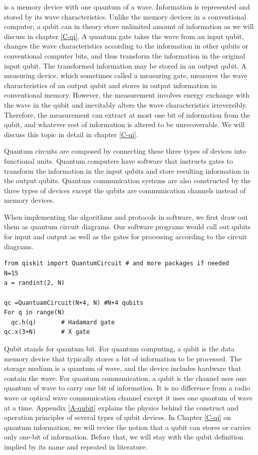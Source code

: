 \documentclass[Letter,11pt]{book}
\begin{document}
is a memory device with one quantum of a wave. Information is represented and stored by its wave characteristics. Unlike the memory devices in a conventional computer, a qubit can in theory store unlimited amount of information as we will discuss in chapter \ref{C-qi}. A quantum gate takes the wave from an input qubit, changes the wave characteristics according to the information in other qubits or conventional computer bits, and thus transform the information in the original input qubit. The transformed information may be stored in an output qubit. A measuring device, which sometimes called a measuring gate, measures the wave characteristics of an output qubit and stores in output information in conventional memory. However, the measurement involves energy exchange with the wave in the qubit and inevitably alters the wave characteristics irreversibly. Therefore, the measurement can extract at most one bit of information from the qubit, and whatever rest of information is altered to be unrecoverable. We will discuss this topic in detail in chapter \ref{C-qi}.

Quantum circuits are composed by connecting these three types of devices into functional units. Quantum computers have software that instructs gates to transform the information in the input qubits and store resulting information in the output qubits. Quantum communication systems are also constructed by the three types of devices except the qubits are communication channels instead of memory devices.

When implementing the algorithms and protocols in software, we first draw out them as quantum circuit diagrams. Our software programs would call out qubits for input and output as well as the gates for processing according to the circuit diagrams.
\begin{verbatim}
from qiskit import QuantumCircuit # and more packages if needed
N=15
a = randint(2, N) 

qc =QuantuamCircuit(N+4, N)	#N+4 qubits
For q in range(N)
  qc.h(q)		# Hadamard gate
qc.x(3+N)		# X gate
\end{verbatim}
Qubit stands for quantum bit. For quantum computing, a qubit is the data memory device that typically stores a bit of information to be processed. The storage medium is a quantum of wave, and the device includes hardware that contain the wave. For quantum communication, a qubit is the channel uses one quantum of wave to carry one bit of information. It is no difference from a radio wave or optical wave communication channel except it uses one quantum of wave at a time. Appendix \ref{A-qubit} explains the physics behind the construct and operation principles of several types of qubit devices. In Chapter \ref{C-qi} on quantum information, we will revise the notion that a qubit can stores or carries only one-bit of information. Before that, we will stay with the qubit definition implied by its name and repeated in literature.
\end{document}
